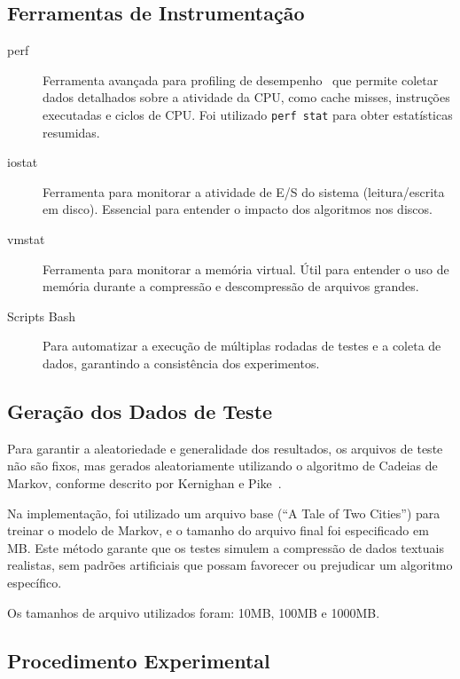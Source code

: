 \documentclass[acmsmall]{acmart}
\begin{document}
\subsection{Ferramentas de Instrumentação}

\begin{description}
  \item[perf] Ferramenta avançada para profiling de desempenho~\cite{perf} que permite coletar dados detalhados sobre a atividade da CPU, como cache misses, instruções executadas e ciclos de CPU. Foi utilizado \texttt{perf stat} para obter estatísticas resumidas.

  \item[iostat] Ferramenta para monitorar a atividade de E/S do sistema (leitura/escrita em disco). Essencial para entender o impacto dos algoritmos nos discos.

  \item[vmstat] Ferramenta para monitorar a memória virtual. Útil para entender o uso de memória durante a compressão e descompressão de arquivos grandes.

  \item[Scripts Bash] Para automatizar a execução de múltiplas rodadas de testes e a coleta de dados, garantindo a consistência dos experimentos.
\end{description}

\subsection{Geração dos Dados de Teste}

Para garantir a aleatoriedade e generalidade dos resultados, os arquivos de teste não são fixos, mas gerados aleatoriamente utilizando o algoritmo de Cadeias de Markov, conforme descrito por Kernighan e Pike~\cite{kernighan1999practice}.

Na implementação, foi utilizado um arquivo base (``A Tale of Two Cities'') para treinar o modelo de Markov, e o tamanho do arquivo final foi especificado em MB. Este método garante que os testes simulem a compressão de dados textuais realistas, sem padrões artificiais que possam favorecer ou prejudicar um algoritmo específico.

Os tamanhos de arquivo utilizados foram: 10MB, 100MB e 1000MB.

\subsection{Procedimento Experimental}
\end{document}
